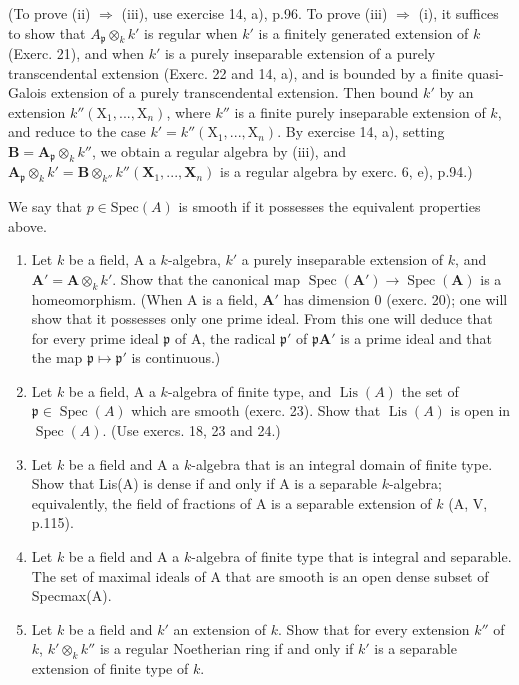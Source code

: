 (To prove (ii) \(\Rightarrow\) (iii), use exercise 14, a), p.96. To prove (iii) \(\Rightarrow\) (i), it suffices to show that \(A_{\mathfrak p} \otimes_k k'\) is regular when \(k'\) is a finitely generated extension of \(k\) (Exerc. 21), and when \(k'\) is a purely inseparable extension of a purely transcendental extension (Exerc. 22 and 14, a), and is bounded by a finite quasi-Galois extension of a purely transcendental extension. Then bound \(k'\) by an extension \(k''(\mathrm{X}_1, ..., \mathrm{X}_n)\), where \(k''\) is a finite purely inseparable extension of \(k\), and reduce to the case \(k' = k''(\mathrm{X}_1, ..., \mathrm{X}_n)\). By exercise 14, a), setting \(\mathbf{B} = \mathbf{A}_{\mathfrak{p}} \otimes_k k''\), we obtain a regular algebra by (iii), and \(\mathbf{A}_{\mathfrak{p}} \otimes_k k' = \mathbf{B} \otimes_{k''} k''(\mathbf{X}_1, ..., \mathbf{X}_n)\) is a regular algebra by exerc. 6, e), p.94.)

We say that \(p \in \text{Spec}(A)\) is smooth if it possesses the equivalent properties above.

\begin{enumerate}
\def\labelenumi{\arabic{enumi})}
\setcounter{enumi}{23}
\item
  Let \(k\) be a field, A a \(k\)-algebra, \(k'\) a purely inseparable extension of \(k\), and \(\mathbf{A}' = \mathbf{A} \otimes_k k'\). Show that the canonical map \(\operatorname{Spec}(\mathbf{A}') \to \operatorname{Spec}(\mathbf{A})\) is a homeomorphism. (When A is a field, \(\mathbf{A}'\) has dimension 0 (exerc. 20); one will show that it possesses only one prime ideal. From this one will deduce that for every prime ideal \(\mathfrak{p}\) of A, the radical \(\mathfrak{p}'\) of \(\mathfrak{p}\mathbf{A}'\) is a prime ideal and that the map \(\mathfrak{p} \mapsto \mathfrak{p}'\) is continuous.)
\item
  Let \(k\) be a field, A a \(k\)-algebra of finite type, and \(\operatorname{Lis}(A)\) the set of \(\mathfrak{p} \in \operatorname{Spec}(A)\) which are smooth (exerc. 23). Show that \(\operatorname{Lis}(A)\) is open in \(\operatorname{Spec}(A)\). (Use exercs. 18, 23 and 24.)
\item
  Let \(k\) be a field and A a \(k\)-algebra that is an integral domain of finite type. Show that Lis(A) is dense if and only if A is a separable \(k\)-algebra; equivalently, the field of fractions of A is a separable extension of \(k\) (A, V, p.115).
\item
  Let \(k\) be a field and A a \(k\)-algebra of finite type that is integral and separable. The set of maximal ideals of A that are smooth is an open dense subset of Specmax(A).
\item
  Let \(k\) be a field and \(k'\) an extension of \(k\). Show that for every extension \(k''\) of \(k\), \(k' \otimes_k k''\) is a regular Noetherian ring if and only if \(k'\) is a separable extension of finite type of \(k\).
\end{enumerate}

